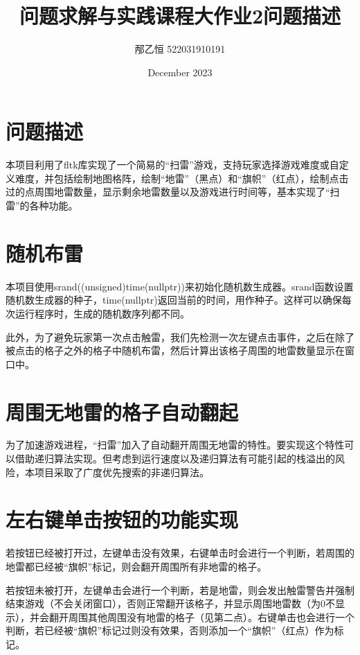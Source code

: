 \documentclass{article}
\title{问题求解与实践课程大作业2问题描述}
\author{邴乙恒 522031910191}
\date{December 2023}
\begin{document}
\begin{CJK}{UTF8}{gbsn}

\maketitle

\section{问题描述}

本项目利用了fltk库实现了一个简易的“扫雷”游戏，支持玩家选择游戏难度或自定义难度，并包括绘制地图格阵，绘制“地雷”（黑点）和“旗帜”（红点），绘制点击过的点周围地雷数量，显示剩余地雷数量以及游戏进行时间等，基本实现了“扫雷”的各种功能。

\section{随机布雷}

本项目使用srand((unsigned)time(nullptr))来初始化随机数生成器。srand函数设置随机数生成器的种子，time(nullptr)返回当前的时间，用作种子。这样可以确保每次运行程序时，生成的随机数序列都不同。

此外，为了避免玩家第一次点击触雷，我们先检测一次左键点击事件，之后在除了被点击的格子之外的格子中随机布雷，然后计算出该格子周围的地雷数量显示在窗口中。

\section{周围无地雷的格子自动翻起}

为了加速游戏进程，“扫雷”加入了自动翻开周围无地雷的特性。要实现这个特性可以借助递归算法实现。但考虑到运行速度以及递归算法有可能引起的栈溢出的风险，本项目采取了广度优先搜索的非递归算法。

\section{左右键单击按钮的功能实现}

若按钮已经被打开过，左键单击没有效果，右键单击时会进行一个判断，若周围的地雷都已经被“旗帜”标记，则会翻开周围所有非地雷的格子。

若按钮未被打开，左键单击会进行一个判断，若是地雷，则会发出触雷警告并强制结束游戏（不会关闭窗口），否则正常翻开该格子，并显示周围地雷数（为0不显示），并会翻开周围其他周围没有地雷的格子（见第二点）。右键单击也会进行一个判断，若已经被“旗帜”标记过则没有效果，否则添加一个“旗帜”（红点）作为标记。


\end{CJK}
\end{document}
